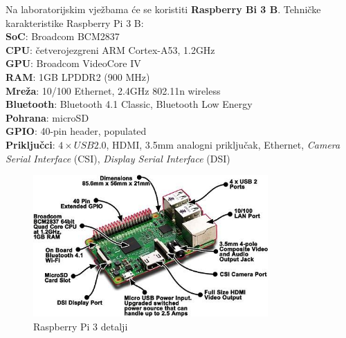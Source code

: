 \documentclass[11pt]{article}
\begin{document}
\newline
\newline
Na laboratorijskim vježbama će se koristiti \textbf{Raspberry Bi 3 B}.
\newline
\newline
Tehničke karakteristike Raspberry Pi 3 B: \\
\textbf{SoC}: Broadcom BCM2837 \\
\textbf{CPU}: četverojezgreni ARM Cortex-A53, 1.2GHz \\
\textbf{GPU}: Broadcom VideoCore IV \\
\textbf{RAM}: 1GB LPDDR2 (900 MHz) \\
\textbf{Mreža}: 10/100 Ethernet, 2.4GHz 802.11n wireless \\
\textbf{Bluetooth}: Bluetooth 4.1 Classic, Bluetooth Low Energy \\
\textbf{Pohrana}: microSD \\
\textbf{GPIO}: 40-pin header, populated \\
\textbf{Priključci}: $4\times USB 2.0$, HDMI, 3.5mm analogni priključak,
 Ethernet, \textit{Camera Serial Interface} (CSI), \textit{Display Serial
 Interface} (DSI)
\begin{figure}%
\centering
\includegraphics[width=0.8\textwidth]{rpi-3-details.jpg}
\captionsetup{justification=centering}
\caption{Raspberry Pi 3 detalji}
\end{figure}
\end{document}
